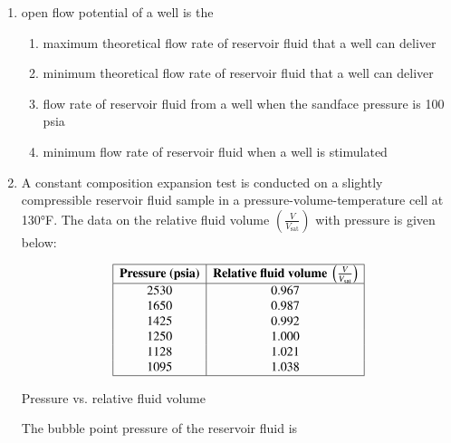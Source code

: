 \documentclass[journal,12pt,onecolumn]{IEEEtran}
\theoremstyle{remark}
\begin{document}
\begin{enumerate}
 \item open flow potential of a well is the
\begin{enumerate}
    \item maximum theoretical flow rate of reservoir fluid that a well can deliver
    \item minimum theoretical flow rate of reservoir fluid that a well can deliver
    \item flow rate of reservoir fluid from a well when the sandface pressure is 100 psia
    \item minimum flow rate of reservoir fluid when a well is stimulated
\end{enumerate}
\hfill{}



\item  A constant composition expansion  test is conducted on a slightly compressible reservoir fluid sample in a pressure-volume-temperature  cell at 130°F. The data on the relative fluid volume $\left(\frac{V}{V_{\text{sat}}}\right)$ with pressure is given below:

\begin{table}[h]
\centering
\[
\begin{array}{|c|c|}
\hline
\textbf{Pressure (psia)} & \textbf{Relative fluid volume }\left(\tfrac{V}{V_{\text{sat}}}\right) \\
\hline
2530 & 0.967 \\
1650 & 0.987 \\
1425 & 0.992 \\
1250 & 1.000 \\
1128 & 1.021 \\
1095 & 1.038 \\
\hline
\end{array}
\]
\caption{Pressure vs. relative fluid volume}
\label{tab:fluid_volume}
\end{table}


The bubble point pressure  of the reservoir fluid is
\begin{enumerate}
\end{enumerate}
\hfill{}




\end{enumerate}
\end{document}
